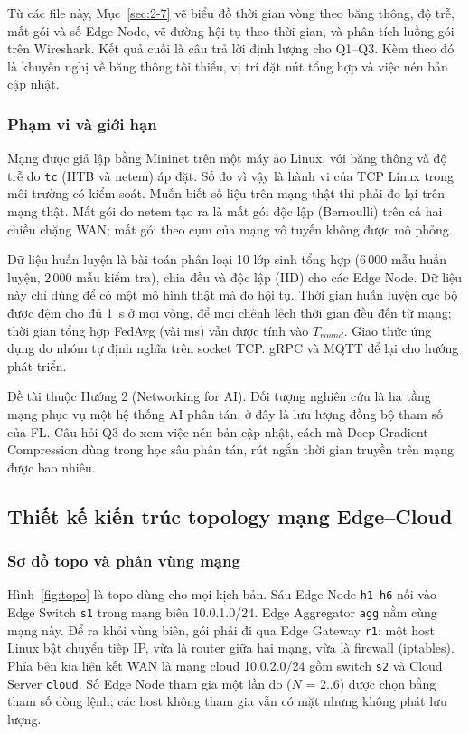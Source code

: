 Từ các file này, Mục~\ref{sec:2-7} vẽ biểu đồ thời gian vòng theo băng thông, độ trễ, mất gói và số Edge Node, vẽ đường hội tụ theo thời gian, và phân tích luồng gói trên Wireshark. Kết quả cuối là câu trả lời định lượng cho Q1--Q3. Kèm theo đó là khuyến nghị về băng thông tối thiểu, vị trí đặt nút tổng hợp và việc nén bản cập nhật.

\subsubsection{Phạm vi và giới hạn}
Mạng được giả lập bằng Mininet \cite{lantz2010mininet} trên một máy ảo Linux, với băng thông và độ trễ do \texttt{tc} (HTB và netem) áp đặt. Số đo vì vậy là hành vi của TCP Linux trong môi trường có kiểm soát. Muốn biết số liệu trên mạng thật thì phải đo lại trên mạng thật. Mất gói do netem tạo ra là mất gói độc lập (Bernoulli) trên cả hai chiều chặng WAN; mất gói theo cụm của mạng vô tuyến không được mô phỏng.

Dữ liệu huấn luyện là bài toán phân loại 10 lớp sinh tổng hợp (6\,000 mẫu huấn luyện, 2\,000 mẫu kiểm tra), chia đều và độc lập (IID) cho các Edge Node. Dữ liệu này chỉ dùng để có một mô hình thật mà đo hội tụ. Thời gian huấn luyện cục bộ được đệm cho đủ 1~s ở mọi vòng, để mọi chênh lệch thời gian đều đến từ mạng; thời gian tổng hợp FedAvg (vài ms) vẫn được tính vào $T_{round}$. Giao thức ứng dụng do nhóm tự định nghĩa trên socket TCP. gRPC và MQTT để lại cho hướng phát triển.

Đề tài thuộc Hướng 2 (Networking for AI). Đối tượng nghiên cứu là hạ tầng mạng phục vụ một hệ thống AI phân tán, ở đây là lưu lượng đồng bộ tham số của FL. Câu hỏi Q3 đo xem việc nén bản cập nhật, cách mà Deep Gradient Compression \cite{lin2018dgc} dùng trong học sâu phân tán, rút ngắn thời gian truyền trên mạng được bao nhiêu.

\subsection{Thiết kế kiến trúc topology mạng Edge--Cloud}
\label{sec:2-3}

\subsubsection{Sơ đồ topo và phân vùng mạng}
Hình~\ref{fig:topo} là topo dùng cho mọi kịch bản. Sáu Edge Node \texttt{h1}--\texttt{h6} nối vào Edge Switch \texttt{s1} trong mạng biên 10.0.1.0/24. Edge Aggregator \texttt{agg} nằm cùng mạng này. Để ra khỏi vùng biên, gói phải đi qua Edge Gateway \texttt{r1}: một host Linux bật chuyển tiếp IP, vừa là router giữa hai mạng, vừa là firewall (iptables). Phía bên kia liên kết WAN là mạng cloud 10.0.2.0/24 gồm switch \texttt{s2} và Cloud Server \texttt{cloud}. Số Edge Node tham gia một lần đo ($N$ = 2..6) được chọn bằng tham số dòng lệnh; các host không tham gia vẫn có mặt nhưng không phát lưu lượng.

